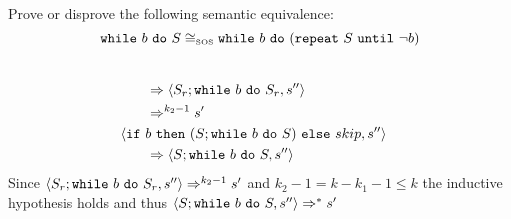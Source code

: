 \begin{exercise}{
    Prove or disprove the following semantic equivalence:
    \[ \texttt{while}\ b\ \texttt{do}\ S \cong_{\text{\tiny SOS}} \texttt{while}\ b\ \texttt{do}\ (\texttt{repeat}\ S\ \texttt{until}\ \neg b)  \]\vspace*{-0.6cm}
}
\begin{itemize}
\begin{itemize}
\begin{itemize}
\begin{itemize}
\begin{align*}
                                    \\&\qquad\Rightarrow \left<S_r; \texttt{while}\ b\ \texttt{do}\ S_r, s''\right>
                                    \\&\qquad\Rightarrow^{k_2 - 1} s'
                                    \\
                                    &\left<\texttt{if}\ b\ \texttt{then}\ (S; \texttt{while}\ b\ \texttt{do}\ S)\ \texttt{else}\ skip, s''\right>
                                    \\&\qquad\Rightarrow \left<S; \texttt{while}\ b\ \texttt{do}\ S, s''\right>
                                \end{align*}
                                Since $\left<S_r; \texttt{while}\ b\ \texttt{do}\ S_r, s''\right> \Rightarrow^{k_2 - 1} s'$ and $k_2 - 1 = k - k_1 - 1 \leq k$ the inductive hypothesis holds and thus $\left<S; \texttt{while}\ b\ \texttt{do}\ S, s''\right> \Rightarrow^* s'$
                        \end{itemize}
                    \end{itemize}
            \end{itemize}
    \end{itemize}
\end{exercise}
